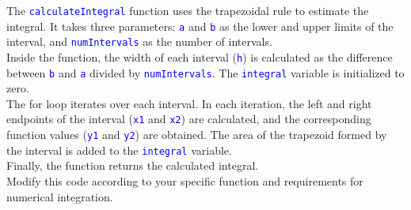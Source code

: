 \documentclass{article}
\begin{document}
The \textcolor{blue}{\texttt{calculateIntegral}} function uses the trapezoidal rule to estimate the integral. It takes three parameters: \textcolor{blue}{\texttt{a}} and \textcolor{blue}{\texttt{b}} as the lower and upper limits of the interval, and \textcolor{blue}{\texttt{numIntervals}} as the number of intervals. \\

Inside the function, the width of each interval (\textcolor{blue}{\texttt{h}}) is calculated as the difference between \textcolor{blue}{\texttt{b}} and \textcolor{blue}{\texttt{a}} divided by \textcolor{blue}{\texttt{numIntervals}}. The \textcolor{blue}{\texttt{integral}} variable is initialized to zero. \\

The for loop iterates over each interval. In each iteration, the left and right endpoints of the interval (\textcolor{blue}{\texttt{x1}} and \textcolor{blue}{\texttt{x2}}) are calculated, and the corresponding function values (\textcolor{blue}{\texttt{y1}} and \textcolor{blue}{\texttt{y2}}) are obtained. The area of the trapezoid formed by the interval is added to the \textcolor{blue}{\texttt{integral}} variable. \\

Finally, the function returns the calculated integral. \\
 
Modify this code according to your specific function and requirements for numerical integration. 
\end{document}
